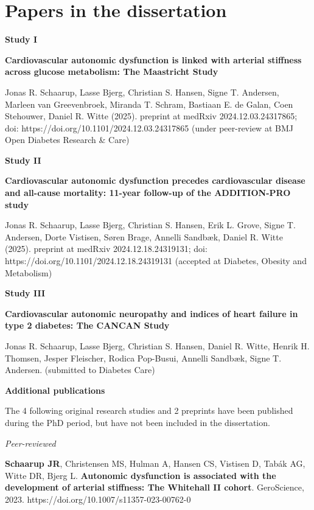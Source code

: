 \documentclass[
  a4paper,
  headsepline=true,
  open=left]{scrbook}
\begin{document}
\hypertarget{sec-linked-papers}{%
\chapter*{Papers in the dissertation}\label{sec-linked-papers}}


\textbf{Study I}

\textbf{Cardiovascular autonomic dysfunction is linked with arterial
stiffness across glucose metabolism: The Maastricht Study}

Jonas R. Schaarup, Lasse Bjerg, Christian S. Hansen, Signe T. Andersen,
Marleen van Greevenbroek, Miranda T. Schram, Bastiaan E. de Galan, Coen
Stehouwer, Daniel R. Witte (2025). preprint at medRxiv
2024.12.03.24317865; doi: https://doi.org/10.1101/2024.12.03.24317865
(under peer-review at BMJ Open Diabetes Research \& Care)

\textbf{Study II}

\textbf{Cardiovascular autonomic dysfunction precedes cardiovascular
disease and all-cause mortality: 11-year follow-up of the ADDITION-PRO
study}

Jonas R. Schaarup, Lasse Bjerg, Christian S. Hansen, Erik L. Grove,
Signe T. Andersen, Dorte Vistisen, Søren Brage, Annelli Sandbæk, Daniel
R. Witte (2025). preprint at medRxiv 2024.12.18.24319131; doi:
https://doi.org/10.1101/2024.12.18.24319131 (accepted at Diabetes,
Obesity and Metabolism)

\textbf{Study III}

\textbf{Cardiovascular autonomic neuropathy and indices of heart failure
in type 2 diabetes: The CANCAN Study}

Jonas R. Schaarup, Lasse Bjerg, Christian S. Hansen, Daniel R. Witte,
Henrik H. Thomsen, Jesper Fleischer, Rodica Pop-Busui, Annelli Sandbæk,
Signe T. Andersen. (submitted to Diabetes Care)

\newpage

\textbf{Additional publications}

The 4 following original research studies and 2 preprints have been
published during the PhD period, but have not been included in the
dissertation.

\emph{Peer-reviewed}

\textbf{Schaarup JR}, Christensen MS, Hulman A, Hansen CS, Vistisen D,
Tabák AG, Witte DR, Bjerg L. \textbf{Autonomic dysfunction is associated
with the development of arterial stiffness: The Whitehall II cohort}.
GeroScience, 2023. https://doi.org/10.1007/s11357-023-00762-0
\end{document}
